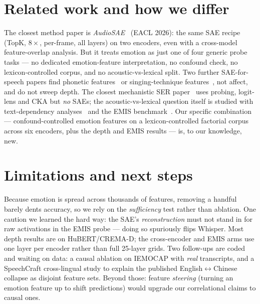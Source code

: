 \documentclass[sigconf,anonymous,nonacm]{acmart}
\begin{document}
\section{Related work and how we differ}
The closest method paper is \emph{AudioSAE}~\cite{audiosae2026} (EACL 2026): the same SAE recipe (TopK, $8\times$, per-frame, all layers) on two encoders, even with a cross-model feature-overlap analysis. But it treats emotion as just one of four generic probe tasks --- no dedicated emotion-feature interpretation, no confound check, no lexicon-controlled corpus, and no acoustic-vs-lexical split. Two further SAE-for-speech papers find phonetic features~\cite{pluth2026asrsae} or singing-technique features~\cite{mariotte2026audioexplain}, not affect, and do not sweep depth. The closest mechanistic SER paper~\cite{ma2026lora} uses probing, logit-lens and CKA but \emph{no} SAEs; the acoustic-vs-lexical question itself is studied with text-dependency analyses~\cite{textdep2024,lexicalser2025} and the EMIS benchmark~\cite{emis2025}. Our specific combination --- confound-controlled emotion features on a lexicon-controlled factorial corpus across six encoders, plus the depth and EMIS results --- is, to our knowledge, new.

\section{Limitations and next steps}
Because emotion is spread across thousands of features, removing a handful barely dents accuracy, so we rely on the \emph{sufficiency} test rather than ablation. One caution we learned the hard way: the SAE's \emph{reconstruction} must not stand in for raw activations in the EMIS probe --- doing so spuriously flips Whisper. Most depth results are on HuBERT/CREMA-D; the cross-encoder and EMIS arms use one layer per encoder rather than full 25-layer grids. Two follow-ups are coded and waiting on data: a causal ablation on IEMOCAP with \emph{real} transcripts, and a SpeechCraft cross-lingual study to explain the published English$\leftrightarrow$Chinese collapse as disjoint feature sets. Beyond those: feature \emph{steering} (turning an emotion feature up to shift predictions) would upgrade our correlational claims to causal ones.



\end{document}

